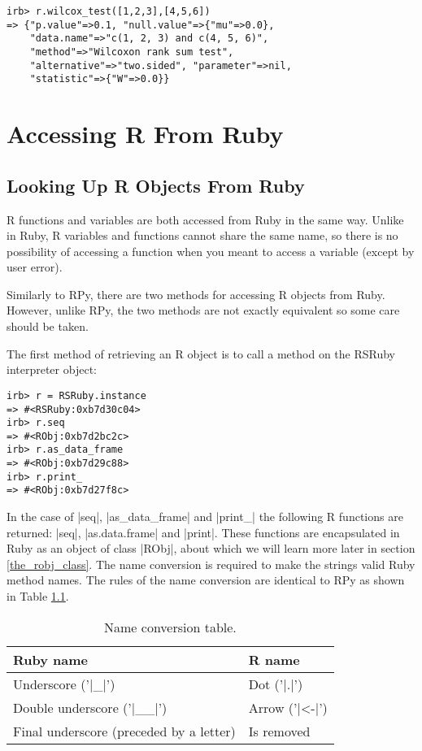 \documentclass[a4paper,12pt]{book}
\begin{document}
\begin{Verbatim}
irb> r.wilcox_test([1,2,3],[4,5,6])
=> {"p.value"=>0.1, "null.value"=>{"mu"=>0.0},
    "data.name"=>"c(1, 2, 3) and c(4, 5, 6)",
    "method"=>"Wilcoxon rank sum test",
    "alternative"=>"two.sided", "parameter"=>nil,
    "statistic"=>{"W"=>0.0}}
\end{Verbatim}

\chapter{Accessing R From Ruby}

\section{Looking Up R Objects From Ruby}

R functions and variables are both accessed from Ruby in the same way. Unlike in Ruby, R variables and functions cannot share the same name, so there is no possibility of accessing a function when you meant to access a variable (except by user error).

Similarly to RPy, there are two methods for accessing R objects from Ruby. However, unlike RPy, the two methods are not exactly equivalent so some care should be taken.

The first method of retrieving an R object is to call a method on the RSRuby interpreter object:

\begin{Verbatim}
irb> r = RSRuby.instance
=> #<RSRuby:0xb7d30c04>
irb> r.seq
=> #<RObj:0xb7d2bc2c>
irb> r.as_data_frame
=> #<RObj:0xb7d29c88>
irb> r.print_
=> #<RObj:0xb7d27f8c>
\end{Verbatim}

In the case of |seq|, |as_data_frame| and |print_| the following R functions are returned: |seq|, |as.data.frame| and |print|. These functions are encapsulated in Ruby as an object of class |RObj|, about which we will learn more later in section \ref{the_robj_class}. The name conversion is required to make the strings valid Ruby method names. The rules of the name conversion are identical to RPy as shown in Table \ref{name_conversions}.

\begin{table}[h]
\begin{center}
\begin{tabular}{ll} \hline
Ruby name & R name \\ \hline
Underscore ('|_|') & Dot ('|.|') \\
Double underscore ('|__|') & Arrow ('|<-|') \\
Final underscore (preceded by a letter) & Is removed \\ \hline
\end{tabular}
\label{name_conversions}
\caption{Name conversion table.}
\end{center}
\end{table}
\end{document}
